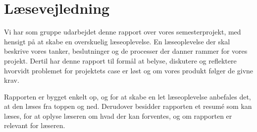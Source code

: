 \clearpage
\section{Læsevejledning}
Vi har som gruppe udarbejdet denne rapport over vores semesterprojekt, med hensigt på at skabe en overskuelig læseoplevelse. En læseoplevelse der skal beskrive vores tanker, beslutninger og de processer der danner rammer for vores projekt. Dertil har denne rapport til formål at belyse, diskutere og reflektere hvorvidt problemet for projektets case er løst og om vores produkt følger de givne krav.

Rapporten er bygget enkelt op, og for at skabe en let læseoplevelse anbefales det, at den læses fra toppen og ned. Derudover besidder rapporten et resumé som kan læses, for at oplyse læseren om hvad der kan forventes, og om rapporten er relevant for læseren. 